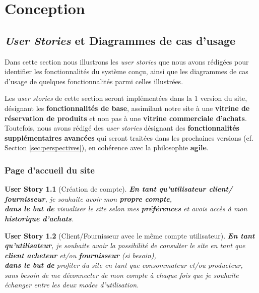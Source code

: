 \documentclass[a4paper,12pt]{report}
\theoremstyle{break}
\newtheorem*{userStory}{User Story}
\theoremstyle{break}
\theoremstyle{break}
\theoremstyle{break}
\theoremstyle{definition}
\theoremstyle{remark}
\begin{document}
\chapter{Conception}
\section{\textit{User Stories} et Diagrammes de cas d'usage}
Dans cette section nous illustrons les \textit{user stories} que nous avons rédigées pour identifier les fonctionnalités du système conçu, ainsi que les diagrammes de cas d'usage de quelques fonctionnalités parmi celles illustrées.

Les \textit{user stories} de cette section seront implémentées dans la $1$\iere{} version du site, désignant les \textbf{fonctionnalités de base}, assimilant notre site à une \textbf{vitrine de réservation de produits} et non pas à une \textbf{vitrine commerciale d'achats}. Toutefois, nous avons rédigé des \textit{user stories} désignant des \textbf{fonctionnalités supplémentaires avancées} qui seront traitées dans les prochaines versions (cf. Section \ref{sec:perspectives}), en cohérence avec la philosophie \textbf{agile}.

\subsection{Page d'accueil du site}
\begin{userStory}[Création de compte]
\textbf{En tant qu'utilisateur {\color{green}client}/{\color{red} fournisseur}}, je souhaite avoir mon \textbf{propre compte},\\
\indent
\textbf{dans le but de} visualiser le site selon mes \textbf{préférences} et avois accès à mon \textbf{historique d'achats}.
\end{userStory}

\begin{userStory}[Client/Fournisseur avec le même compte utilisateur]
\textbf{En tant qu'utilisateur}, je souhaite avoir la possibilité de consulter le site en tant que \textbf{{\color{green}client acheteur}} et/ou \textbf{{\color{red} fournisseur}} (\textit{si besoin}),\\
\indent
\textbf{dans le but de} profiter du site en tant que consommateur et/ou producteur, sans besoin de me déconnecter de mon compte à chaque fois que je souhaite échanger entre les deux modes d'utilisation.
\end{userStory}
\end{document}
